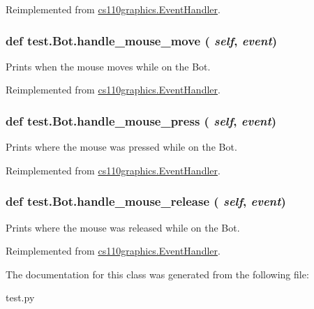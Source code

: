Reimplemented from \hyperlink{classcs110graphics_1_1EventHandler_a5deaf2b6b8055e97ac0ddf6603132c64}{cs110graphics.EventHandler}.\hypertarget{classtest_1_1Bot_ad1464516fb04013fa7e353a78f0ec218}{
\subsubsection[{handle\_\-mouse\_\-move}]{\setlength{\rightskip}{0pt plus 5cm}def test.Bot.handle\_\-mouse\_\-move ( {\em self}, \/   {\em event})}}
\label{classtest_1_1Bot_ad1464516fb04013fa7e353a78f0ec218}
\begin{DoxyVerb}Prints when the mouse moves while on the Bot. \end{DoxyVerb}
 

Reimplemented from \hyperlink{classcs110graphics_1_1EventHandler_a521fdcd170d15c0b8baa124c78b6d1ef}{cs110graphics.EventHandler}.\hypertarget{classtest_1_1Bot_a970422a4391cc2b9ff89a2e42063bb6e}{
\subsubsection[{handle\_\-mouse\_\-press}]{\setlength{\rightskip}{0pt plus 5cm}def test.Bot.handle\_\-mouse\_\-press ( {\em self}, \/   {\em event})}}
\label{classtest_1_1Bot_a970422a4391cc2b9ff89a2e42063bb6e}
\begin{DoxyVerb}Prints where the mouse was pressed while on the Bot. \end{DoxyVerb}
 

Reimplemented from \hyperlink{classcs110graphics_1_1EventHandler_a547873123ebcd3fcc63a2e03d2a2fee3}{cs110graphics.EventHandler}.\hypertarget{classtest_1_1Bot_a18fc05b6e2c1e42e1b6c639f4844a059}{
\subsubsection[{handle\_\-mouse\_\-release}]{\setlength{\rightskip}{0pt plus 5cm}def test.Bot.handle\_\-mouse\_\-release ( {\em self}, \/   {\em event})}}
\label{classtest_1_1Bot_a18fc05b6e2c1e42e1b6c639f4844a059}
\begin{DoxyVerb}Prints where the mouse was released while on the Bot. \end{DoxyVerb}
 

Reimplemented from \hyperlink{classcs110graphics_1_1EventHandler_a320a7dbf68d37e0101b237bff1713088}{cs110graphics.EventHandler}.

The documentation for this class was generated from the following file:\begin{DoxyCompactItemize}
\item 
test.py\end{DoxyCompactItemize}
